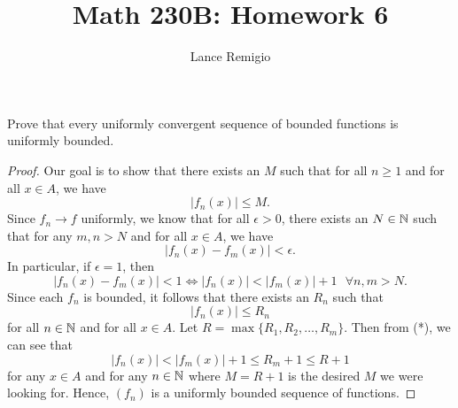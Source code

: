 \documentclass[a4paper]{article}
\title{Math 230B: Homework 6}
\author{Lance Remigio}
\begin{document}
\maketitle
\begin{problem}
    Prove that every uniformly convergent sequence of bounded functions is uniformly bounded. 
\end{problem}
\begin{proof}
Our goal is to show that there exists an \( M  \) such that for all \( n \geq 1  \) and for all \( x \in A  \), we have 
\[  | {f}_{n}(x) | \leq M.  \]
Since \( {f}_{n} \to f  \) uniformly, we know that for all \( \epsilon > 0  \), there exists an \( N \in \mathbb{N} \) such that for any \( m,n > N  \) and for all \( x \in A  \), we have 
\[  |{f}_{n}(x) - {f}_{m}(x)|< \epsilon. \]
In particular, if \( \epsilon = 1  \), then 
\[  | {f}_{n}(x) - {f}_{m}(x) | < 1 \iff | {f}_{n}(x) | < | {f}_{m}(x) | + 1  \ \ \ \forall n,m > N. \tag{*}  \]
Since each \( {f}_{n}  \) is bounded, it follows that there exists an \( {R}_{n} \) such that 
\[  | {f}_{n}(x) |  \leq {R}_{n} \]
for all \( n \in \mathbb{N} \) and for all \( x \in A  \). Let \( R = \max \{ {R}_{1}, {R}_{2}, \dots, {R}_{m} \}  \). Then from (*), we can see that 
\[  | {f}_{n}(x) | < | {f}_{m}(x) | + 1 \leq {R}_{m} + 1 \leq R + 1   \]
for any \( x \in A  \) and for any \( n \in \mathbb{N} \) where \( M = R + 1  \) is the desired \( M  \) we were looking for. Hence, \( ({f}_{n}) \) is a uniformly bounded sequence of functions.
\end{proof}
\end{document}
